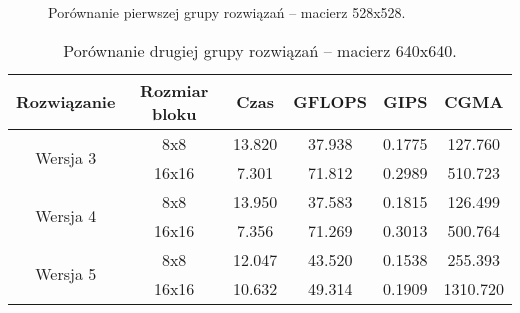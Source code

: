 \begin{figure}[H]
\begin{minipage}[c]{0.46\textwidth}
\vspace{18pt}

\end{minipage}

\caption{Porównanie pierwszej grupy rozwiązań -- macierz 528x528.}

\end{figure}

\begin{table}[H]
\centering
\begin{tabular}{|c|c|c|c|c|c|}
\hline
Rozwiązanie & Rozmiar bloku & Czas & GFLOPS & GIPS & CGMA \\ \hline
\multirow{2}{*}{Wersja 3} & 8x8 & 13.820 & 37.938 & 0.1775 & 127.760 \\ \cline{2-6}
& 16x16 & 7.301 & 71.812 & 0.2989 & 510.723 \\ \hline
\multirow{2}{*}{Wersja 4} & 8x8 & 13.950 & 37.583 & 0.1815 & 126.499 \\ \cline{2-6}
& 16x16 & 7.356 & 71.269 & 0.3013 & 500.764 \\ \hline
\multirow{2}{*}{Wersja 5} & 8x8 & 12.047 & 43.520 & 0.1538 & 255.393 \\ \cline{2-6}
& 16x16 & 10.632 & 49.314 & 0.1909 & 1310.720 \\ \hline
\end{tabular}
\caption{Porównanie drugiej grupy rozwiązań -- macierz 640x640.}
\end{table}

